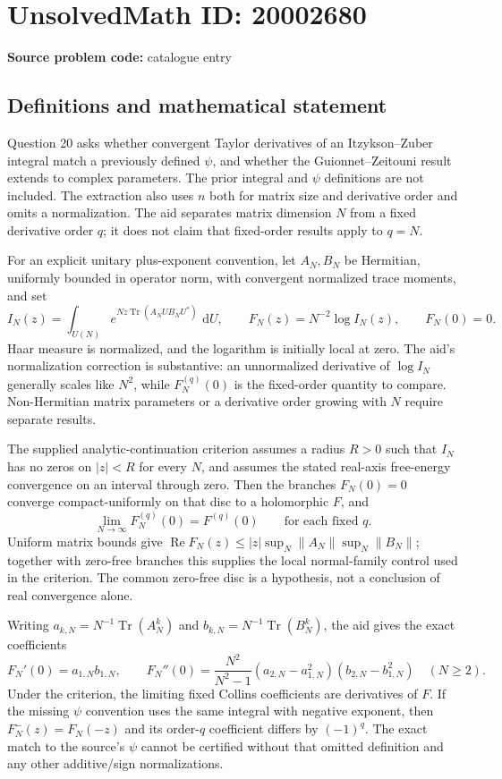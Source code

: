 \documentclass[11pt]{article}
\newcommand{\dd}{\,\mathrm{d}}
\begin{document}
\section*{UnsolvedMath ID: 20002680}
\textbf{Source problem code:} catalogue entry
\subsection{Definitions and mathematical statement}
Question 20 asks whether convergent Taylor derivatives of an Itzykson--Zuber integral match a previously defined $\psi$, and whether the Guionnet--Zeitouni result extends to complex parameters. The prior integral and $\psi$ definitions are not included. The extraction also uses $n$ both for matrix size and derivative order and omits a normalization. The aid separates matrix dimension $N$ from a fixed derivative order $q$; it does not claim that fixed-order results apply to $q=N$.

For an explicit unitary plus-exponent convention, let $A_N,B_N$ be Hermitian, uniformly bounded in operator norm, with convergent normalized trace moments, and set
\[
I_N(z)=\int_{U(N)}e^{Nz\operatorname{Tr}(A_NUB_NU^*)}\,\dd U,
\qquad F_N(z)=N^{-2}\log I_N(z),\qquad F_N(0)=0.
\]
Haar measure is normalized, and the logarithm is initially local at zero. The aid's normalization correction is substantive: an unnormalized derivative of $\log I_N$ generally scales like $N^2$, while $F_N^{(q)}(0)$ is the fixed-order quantity to compare. Non-Hermitian matrix parameters or a derivative order growing with $N$ require separate results.

The supplied analytic-continuation criterion assumes a radius $R>0$ such that $I_N$ has no zeros on $|z|<R$ for every $N$, and assumes the stated real-axis free-energy convergence on an interval through zero. Then the branches $F_N(0)=0$ converge compact-uniformly on that disc to a holomorphic $F$, and
\[
\lim_{N\to\infty}F_N^{(q)}(0)=F^{(q)}(0)\qquad\text{for each fixed }q.
\]
Uniform matrix bounds give $\operatorname{Re}F_N(z)\leq |z|\sup_N\|A_N\|\sup_N\|B_N\|$; together with zero-free branches this supplies the local normal-family control used in the criterion. The common zero-free disc is a hypothesis, not a conclusion of real convergence alone.

Writing $a_{k,N}=N^{-1}\operatorname{Tr}(A_N^k)$ and $b_{k,N}=N^{-1}\operatorname{Tr}(B_N^k)$, the aid gives the exact coefficients
\[
F_N'(0)=a_{1,N}b_{1,N},\qquad
F_N''(0)=\frac{N^2}{N^2-1}
(a_{2,N}-a_{1,N}^2)(b_{2,N}-b_{1,N}^2)\quad(N\geq2).
\]
Under the criterion, the limiting fixed Collins coefficients are derivatives of $F$. If the missing $\psi$ convention uses the same integral with negative exponent, then $F_N^-(z)=F_N(-z)$ and its order-$q$ coefficient differs by $(-1)^q$. The exact match to the source's $\psi$ cannot be certified without that omitted definition and any other additive/sign normalizations.
\end{document}
